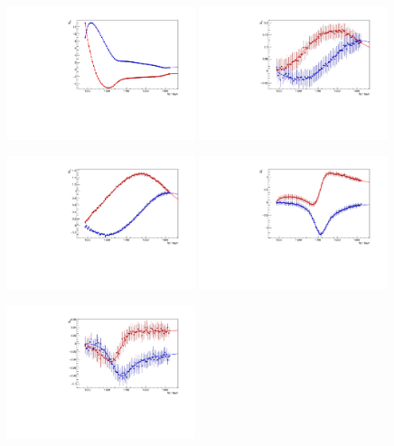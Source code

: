 \documentclass[a4paper,12pt]{report}
\begin{document}
\begin{figure}
  \begin{center}
    \centerline{
    \includegraphics[width=0.49\textwidth]{MAID2015a/PenHeli_dat/plots.0/E0p.pdf}
    \includegraphics[width=0.49\textwidth]{MAID2015a/PenHeli_dat/plots.0/E1p.pdf}
    }
    \centerline{
    \includegraphics[width=0.49\textwidth]{MAID2015a/PenHeli_dat/plots.0/M1p.pdf}
    \includegraphics[width=0.49\textwidth]{MAID2015a/PenHeli_dat/plots.0/M1m.pdf}
    }
    \centerline{
    \includegraphics[width=0.49\textwidth]{MAID2015a/PenHeli_dat/plots.0/E2p.pdf}
}
\end{center}
\end{figure}
\end{document}
